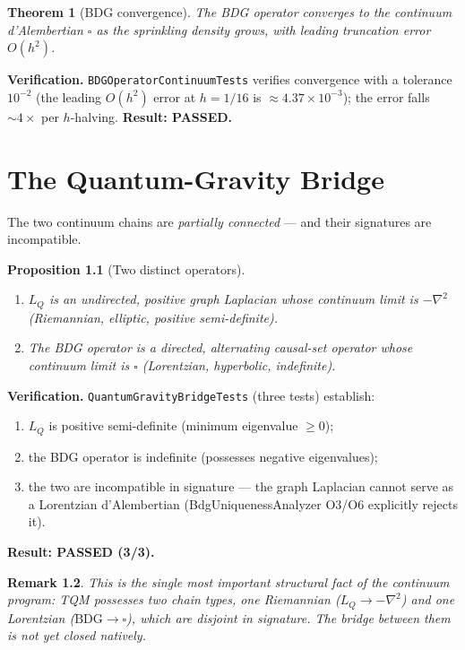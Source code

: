 \documentclass[11pt,twoside]{book}
\newtheorem{theorem}{Theorem}[chapter]
\newtheorem{proposition}[theorem]{Proposition}
\newtheorem{remark}[theorem]{Remark}
\begin{document}
\begin{theorem}[BDG convergence]
The BDG operator converges to the continuum d'Alembertian $\square$ as the sprinkling
density grows, with leading truncation error $O(h^2)$.
\end{theorem}

\textbf{Verification.} \texttt{BDGOperatorContinuumTests} verifies convergence with a
tolerance $10^{-2}$ (the leading $O(h^2)$ error at $h=1/16$ is $\approx4.37\times10^{-3}$);
the error falls $\sim4\times$ per $h$-halving. \textbf{Result: PASSED.}


\chapter{The Quantum-Gravity Bridge}
\label{ch:bridge}

The two continuum chains are \emph{partially connected} — and their signatures are
incompatible.

\begin{proposition}[Two distinct operators]
\begin{enumerate}
\item $L_Q$ is an \emph{undirected, positive} graph Laplacian whose continuum limit is
$-\nabla^2$ (Riemannian, elliptic, positive semi-definite).
\item The BDG operator is a \emph{directed, alternating} causal-set operator whose
continuum limit is $\square$ (Lorentzian, hyperbolic, indefinite).
\end{enumerate}
\end{proposition}

\textbf{Verification.} \texttt{QuantumGravityBridgeTests} (three tests) establish:
\begin{enumerate}
\item $L_Q$ is positive semi-definite (minimum eigenvalue $\ge0$);
\item the BDG operator is indefinite (possesses negative eigenvalues);
\item the two are incompatible in signature — the graph Laplacian cannot serve as a
Lorentzian d'Alembertian (BdgUniquenessAnalyzer O3/O6 explicitly rejects it).
\end{enumerate}
\textbf{Result: PASSED (3/3).}

\begin{remark}
This is the single most important structural fact of the continuum program: TQM possesses
\emph{two} chain types, one Riemannian ($L_Q\to-\nabla^2$) and one Lorentzian
($\mathrm{BDG}\to\square$), which are \emph{disjoint} in signature. The bridge between
them is not yet closed natively.
\end{remark}
\end{document}

